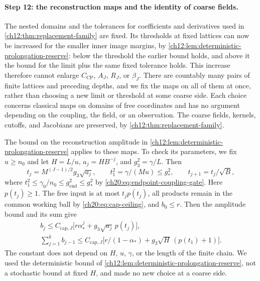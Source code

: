 \paragraph{Step 12: the reconstruction maps and the identity of coarse fields.}
The nested domains and the tolerances for coefficients and derivatives used in \cref{ch12:thm:replacement-family} are fixed. Its thresholds at fixed lattices can now be increased for the smaller inner image margins, by \cref{ch12:lem:deterministic-prolongation-reserve}: below the threshold the earlier bound holds, and above it the bound for the limit plus the same fixed tolerance holds. This increase therefore cannot enlarge $C_{\mathrm{CP}}$, $A_J$, $R_J$, or $\beta_J$. There are countably many pairs of finite lattices and preceding depths, and we fix the maps on all of them at once, rather than choosing a new limit or threshold at some coarse side. Each choice concerns classical maps on domains of free coordinates and has no argument depending on the coupling, the field, or an observation. The coarse fields, kernels, cutoffs, and Jacobians are preserved, by \cref{ch12:thm:replacement-family}.

The bound on the reconstruction amplitude in \cref{ch12:lem:deterministic-prolongation-reserve} applies to these maps. To check its parameters, we fix $u\ge n_0$ and let $H=L/u$, $a_j=HB^{-j}$, and $g_3^2=\gamma/L$. Then
\[
 t_j=M^{(J-1)/2}g_3\sqrt{a_j},\qquad t_1^2=\gamma/(Mu)\le g_*^2,\qquad t_{j+1}=t_j/\sqrt B,
\]
where $t_1^2\le\gamma_0/n_0\le g_{\mathrm{end}}^2\le g_*^2$ by \eqref{ch20:eq:endpoint-coupling-gate}. Here $p(t_j)\ge1$. The free input is at most $t_jp(t_j)$, all products remain in the common working ball by \eqref{ch20:eq:cap-ceiling}, and $b_0\le r$. Then the amplitude bound and its sum give
\begin{equation}\label{ch20:eq:side-uniform-forced-cap}
 \begin{gathered}
 b_j\le C_{\mathrm{cap},J}\bigl[r\alpha_*^j+g_3\sqrt{a_j}\,p(t_j)\bigr],\\
 \sum_{j=1}^kb_{j-1}\le C_{\mathrm{cap},J}\bigl[r/(1-\alpha_*)+g_3\sqrt H\,(p(t_1)+1)\bigr].
 \end{gathered}
\end{equation}
The constant does not depend on $H$, $u$, $\gamma$, or the length of the finite chain. We used the deterministic bound of \cref{ch12:lem:deterministic-prolongation-reserve}, not a stochastic bound at fixed $H$, and made no new choice at a coarse side.

